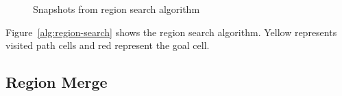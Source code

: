 \begin{figure}[!h]
\centering
            \hfill
            \hfill
            \hfill
            \hfill
            \caption{Snapshots from region search algorithm}
\label{fig:region-search}
\end{figure}

Figure~\ref{alg:region-search} shows the region search algorithm. Yellow represents visited path cells and red represent the goal cell.

\subsection{Region Merge}


